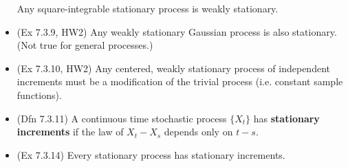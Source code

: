 \documentclass[twoside]{article}
\begin{document}
\begin{itemize}
Any square-integrable stationary process is weakly stationary.

\item (Ex 7.3.9, HW2) Any weakly stationary Gaussian process is also stationary. (Not true for general processes.)

\item (Ex 7.3.10, HW2) Any centered, weakly stationary process of independent increments must be a modification of the trivial process (i.e. constant sample functions).

\item (Dfn 7.3.11) A continuous time stochastic process $\{X_t\}$ has \textbf{stationary increments} if the law of $X_t - X_s$ depends only on $t-s$.

\item (Ex 7.3.14) Every stationary process has stationary increments.

\end{itemize}
\end{document}
